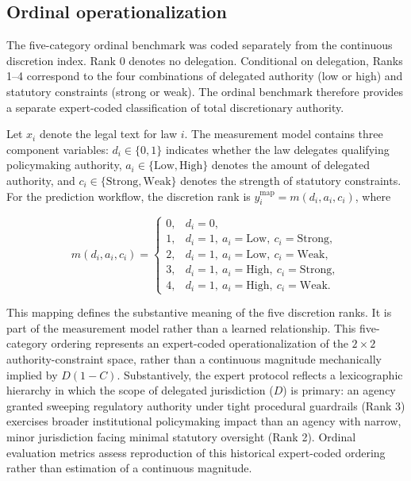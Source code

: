 \documentclass[runningheads]{llncs}
\begin{document}
\vspace{-0.2 cm}
\subsection{Ordinal operationalization}
 The five-category ordinal benchmark was coded separately from the continuous discretion index. Rank 0 denotes no delegation. Conditional on delegation, Ranks 1--4 correspond to the four combinations of delegated authority (low or high) and statutory constraints (strong or weak). The ordinal benchmark therefore provides a separate expert-coded classification of total discretionary authority.

Let $x_i$ denote the legal text for law $i$. The measurement model contains three component variables: $d_i \in \{0,1\}$ indicates whether the law delegates qualifying policymaking authority, $a_i \in \{\mathrm{Low},\mathrm{High}\}$ denotes the amount of delegated authority, and $c_i \in \{\mathrm{Strong},\mathrm{Weak}\}$ denotes the strength of statutory constraints. For the prediction workflow, the discretion rank is $y_i^{\mathrm{map}}=m(d_i,a_i,c_i)$, where

\begin{equation}
 m(d_i,a_i,c_i)=
\begin{cases}
0, & d_i=0,\\
1, & d_i=1,\ a_i=\mathrm{Low},\ c_i=\mathrm{Strong},\\
2, & d_i=1,\ a_i=\mathrm{Low},\ c_i=\mathrm{Weak},\\
3, & d_i=1,\ a_i=\mathrm{High},\ c_i=\mathrm{Strong},\\
4, & d_i=1,\ a_i=\mathrm{High},\ c_i=\mathrm{Weak}.
\end{cases}
\label{eq:rankmap}
\end{equation}

This mapping defines the substantive meaning of the five discretion ranks. It is part of the measurement model rather than a learned relationship. This five-category ordering represents an expert-coded operationalization of the $2 \times 2$ authority-constraint space, rather than a continuous magnitude mechanically implied by $D(1-C)$. Substantively, the expert protocol reflects a lexicographic hierarchy in which the scope of delegated jurisdiction ($D$) is primary: an agency granted sweeping regulatory authority under tight procedural guardrails (Rank 3) exercises broader institutional policymaking impact than an agency with narrow, minor jurisdiction facing minimal statutory oversight (Rank 2). Ordinal evaluation metrics assess reproduction of this historical expert-coded ordering rather than estimation of a continuous magnitude.
\end{document}
